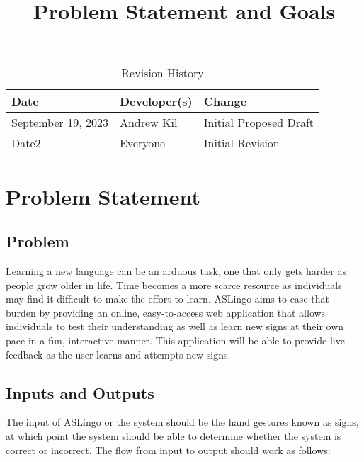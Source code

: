 \documentclass{article}
\title{Problem Statement and Goals\\\progname}
\author{\authname}
\date{}
\begin{document}
\maketitle

\begin{table}[hp]
\caption{Revision History} \label{TblRevisionHistory}
\begin{tabularx}{\textwidth}{llX}
\toprule
\textbf{Date} & \textbf{Developer(s)} & \textbf{Change}\\
\midrule
September 19, 2023 & Andrew Kil & Initial Proposed Draft\\
Date2 & Everyone & Initial Revision\\
\bottomrule
\end{tabularx}
\end{table}

\section{Problem Statement}



\subsection{Problem}
Learning a new language can be an arduous task, one that only gets harder as people grow older in life. Time becomes a more scarce resource as individuals may find it difficult to make the effort to learn. ASLingo aims to ease that burden by providing an online, easy-to-access web application that allows individuals to test their understanding as well as learn new signs at their own pace in a fun, interactive manner. This application will be able to provide live feedback as the user learns and attempts new signs.

\subsection{Inputs and Outputs}

The input of ASLingo or the system should be the hand gestures known as signs, at which point the system should be able to determine whether the system is correct or incorrect. The flow from input to output should work as follows:
\end{document}
